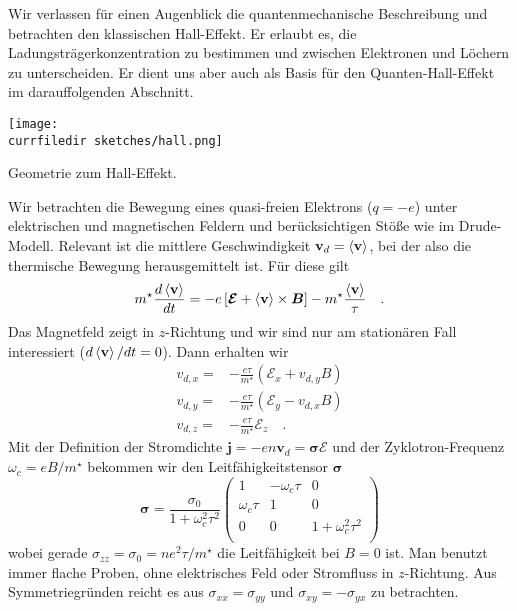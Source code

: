 Wir verlassen für einen Augenblick die quantenmechanische Beschreibung und betrachten den klassischen Hall-Effekt. Er erlaubt es, die Ladungsträgerkonzentration zu bestimmen und zwischen Elektronen und Löchern zu unterscheiden. Er dient uns aber auch als Basis für den Quanten-Hall-Effekt im darauffolgenden Abschnitt.

\begin{marginfigure}
   \texttt{[image: \\currfiledir sketches/hall.png]}
   \caption{Geometrie zum Hall-Effekt.}
\end{marginfigure}

Wir betrachten die Bewegung eines quasi-freien Elektrons ($q=-e$) unter elektrischen und magnetischen Feldern und berücksichtigen Stöße wie im Drude-Modell. Relevant ist die mittlere Geschwindigkeit $\mathbf{v}_d = \braket{\mathbf{v}}$, bei der also die thermische Bewegung herausgemittelt ist. Für diese gilt
\begin{equation}
   m^\star \frac{d \braket{\mathbf{v} }} {dt} = 
   -e \left[ \bm{\mathcal{E}} + \braket{\mathbf{v}} \times \bm{B} \right] 
   - m^\star \frac{\braket{\mathbf{v}}}{\tau} \quad .
\end{equation}
Das Magnetfeld zeigt in $z$-Richtung und wir sind nur am stationären Fall interessiert ($d \braket{\mathbf{v} } / dt = 0$). Dann erhalten wir
\begin{eqnarray}
   v_{d,x} =& - \frac{e \tau}{m^\star} ( \mathcal{E}_x + v_{d,y} B ) \\
   v_{d,y} =& - \frac{e \tau}{m^\star} ( \mathcal{E}_y - v_{d,x} B ) \\
   v_{d,z} =& - \frac{e \tau}{m^\star} \mathcal{E}_z  \quad .
\end{eqnarray}
Mit der Definition der Stromdichte $\mathbf{j} = - e n \mathbf{v}_d = \mathbf{\sigma} \bm{\mathcal{E}}$ 
 und der Zyklotron-Frequenz $\omega_c = e B /m^\star$ 
 bekommen wir den Leitfähigkeitstensor $\mathbf{\sigma}$
\begin{equation}
   \mathbf{\sigma} = \frac{\sigma_0}{ 1+ \omega_c^2 \tau^2}
   \begin{pmatrix}
      1  & - \omega_c \tau & 0 \\
      \omega_c \tau & 1 & 0  \\
      0 & 0 & 1+ \omega_c^2 \tau^2 \\
   \end{pmatrix} \label{eq:4_sigma_tensor}
\end{equation}
wobei gerade $\sigma_{zz} = \sigma_0 = n e^2 \tau / m^\star $ die Leitfähigkeit bei $B=0$ ist. Man benutzt immer flache Proben, ohne elektrisches Feld oder Stromfluss in $z$-Richtung. Aus Symmetriegründen reicht es aus $\sigma_{xx} = \sigma_{yy}$ und $\sigma_{xy} = - \sigma_{yx}$ zu betrachten. 


